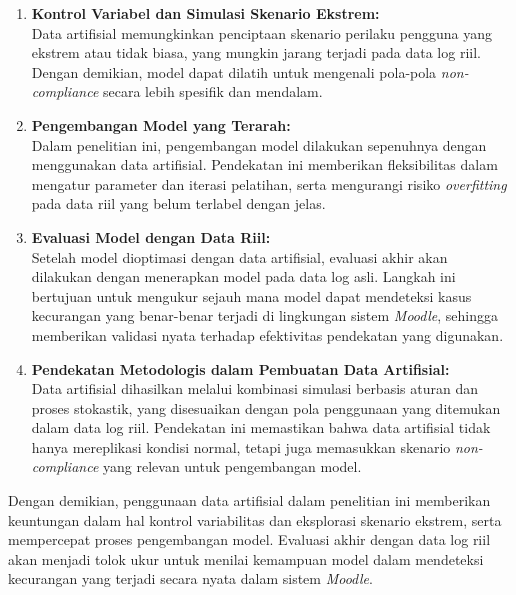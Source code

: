 \begin{enumerate}
    \item \textbf{Kontrol Variabel dan Simulasi Skenario Ekstrem:} \\
    Data artifisial memungkinkan penciptaan skenario perilaku pengguna yang ekstrem atau tidak biasa, yang mungkin jarang terjadi pada data log riil. Dengan demikian, model dapat dilatih untuk mengenali pola-pola \textit{non-compliance} secara lebih spesifik dan mendalam.
    
    \item \textbf{Pengembangan Model yang Terarah:} \\
    Dalam penelitian ini, pengembangan model dilakukan sepenuhnya dengan menggunakan data artifisial. Pendekatan ini memberikan fleksibilitas dalam mengatur parameter dan iterasi pelatihan, serta mengurangi risiko \textit{overfitting} pada data riil yang belum terlabel dengan jelas.
    
    \item \textbf{Evaluasi Model dengan Data Riil:} \\
    Setelah model dioptimasi dengan data artifisial, evaluasi akhir akan dilakukan dengan menerapkan model pada data log asli. Langkah ini bertujuan untuk mengukur sejauh mana model dapat mendeteksi kasus kecurangan yang benar-benar terjadi di lingkungan sistem \textit{Moodle}, sehingga memberikan validasi nyata terhadap efektivitas pendekatan yang digunakan.
    
    \item \textbf{Pendekatan Metodologis dalam Pembuatan Data Artifisial:} \\
    Data artifisial dihasilkan melalui kombinasi simulasi berbasis aturan dan proses stokastik, yang disesuaikan dengan pola penggunaan yang ditemukan dalam data log riil. Pendekatan ini memastikan bahwa data artifisial tidak hanya mereplikasi kondisi normal, tetapi juga memasukkan skenario \textit{non-compliance} yang relevan untuk pengembangan model.
\end{enumerate}

Dengan demikian, penggunaan data artifisial dalam penelitian ini memberikan keuntungan dalam hal kontrol variabilitas dan eksplorasi skenario ekstrem, serta mempercepat proses pengembangan model. Evaluasi akhir dengan data log riil akan menjadi tolok ukur untuk menilai kemampuan model dalam mendeteksi kecurangan yang terjadi secara nyata dalam sistem \textit{Moodle}.

